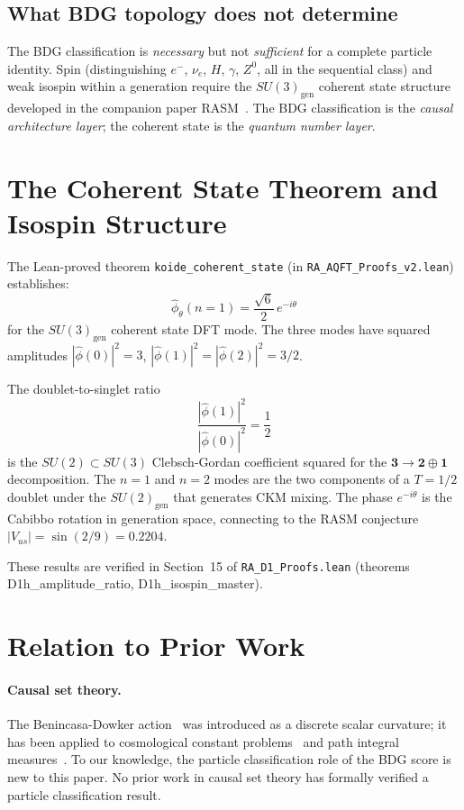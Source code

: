 \documentclass[11pt,a4paper]{article}
\begin{document}
\subsection{What BDG topology does not determine}

The BDG classification is \emph{necessary} but not \emph{sufficient}
for a complete particle identity. Spin (distinguishing $e^-$, $\nu_e$,
$H$, $\gamma$, $Z^0$, all in the sequential class) and weak isospin
within a generation require the $SU(3)_{\mathrm{gen}}$ coherent state
structure developed in the companion paper
RASM~\citep{Sandeman2026RASM}. The BDG classification is the
\emph{causal architecture layer}; the coherent state is the
\emph{quantum number layer}.

\section{The Coherent State Theorem and Isospin Structure}
\label{sec:D1h}

The Lean-proved theorem \texttt{koide\_coherent\_state}
(in \texttt{RA\_AQFT\_Proofs\_v2.lean}) establishes:
\[
  \hat{\phi}_\theta(n=1) = \frac{\sqrt{6}}{2}\,e^{-i\theta}
\]
for the $SU(3)_{\mathrm{gen}}$ coherent state DFT mode. The
three modes have squared amplitudes
$|\hat{\phi}(0)|^2 = 3$, $|\hat{\phi}(1)|^2 = |\hat{\phi}(2)|^2 = 3/2$.

The doublet-to-singlet ratio
\[
  \frac{|\hat{\phi}(1)|^2}{|\hat{\phi}(0)|^2} = \frac{1}{2}
\]
is the $SU(2) \subset SU(3)$ Clebsch-Gordan coefficient squared for
the $\mathbf{3} \to \mathbf{2} \oplus \mathbf{1}$ decomposition.
The $n=1$ and $n=2$ modes are the two components of a $T=1/2$ doublet
under the $SU(2)_{\mathrm{gen}}$ that generates CKM mixing. The
phase $e^{-i\theta}$ is the Cabibbo rotation in generation space,
connecting to the RASM conjecture $|V_{us}| = \sin(2/9) = 0.2204$.

These results are verified in Section~15 of \texttt{RA\_D1\_Proofs.lean}
(theorems D1h\_amplitude\_ratio, D1h\_isospin\_master).

\section{Relation to Prior Work}
\label{sec:related}

\paragraph{Causal set theory.}
The Benincasa-Dowker action~\citep{Benincasa2010} was introduced as a
discrete scalar curvature; it has been applied to cosmological
constant problems~\citep{Sorkin2012} and path integral
measures~\citep{Dowker2013}. To our knowledge, the particle
classification role of the BDG score is new to this paper.
No prior work in causal set theory has formally verified a particle
classification result.
\end{document}
